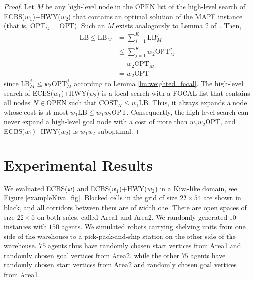 \documentclass[letterpaper]{article}
\theoremstyle{definition}
\newcommand{\open}{\mbox{OPEN}\xspace}
\newcommand{\focal}{\mbox{FOCAL}\xspace}
\newcommand{\lb}{\mbox{LB}\xspace}
\newcommand{\lbn}[1]{\ensuremath{\mbox{LB}_{#1}}}
\newcommand{\lbna}[2]{\ensuremath{\mbox{LB}_{#1}^{#2}}}
\newcommand{\opt}{\mbox{OPT}\xspace}
\newcommand{\optn}[1]{\ensuremath{\mbox{OPT}_{#1}}}
\newcommand{\optna}[2]{\ensuremath{\mbox{OPT}_{#1}^{#2}}}
\newcommand{\costn}[1]{\ensuremath{\mbox{COST}_{#1}}}
\begin{document}
\begin{proof}
  Let $M$ be any high-level node in the \open list of the high-level search of
  ECBS($w_1$)+HWY($w_2$) that contains an optimal solution of the MAPF
  instance (that is, $\optn M = \opt$). Such an $M$ exists analogously to
  Lemma 2 of~\cite{SSFS:AIJ:15}. Then,
{\small
\begin{align*}
\lb \leq \lbn M & = \sum_{j=1}^K \lbna M j \\
& \leq \sum_{j=1}^K w_2 \optna M j \\
& = w_2 \optn M \\
& = w_2 \opt
\end{align*}
} since $\lbna M j \leq w_2 \optna M j$ according to Lemma
\ref{lm:weighted_focal}. The high-level search of ECBS($w_1$)+HWY($w_2$) is a
focal search with a \focal list that contains all nodes $N \in \open$ such
that $\costn N \leq w_1 \lb$. Thus, it always expands a node whose cost is at
most $w_1 \lb \leq w_1 w_2 \opt$. Consequently, the high-level search can
never expand a high-level goal node with a cost of more than $w_1 w_2 \opt$,
and ECBS($w_1$)+HWY($w_2$) is $w_1 w_2$-suboptimal.
\end{proof}

\section{Experimental Results}

We evaluated ECBS($w$) and ECBS($w_1$)+HWY($w_2$) in a Kiva-like domain, see
Figure \ref{exampleKiva_fig}. Blocked cells in the grid of size $22 \times 54$
are shown in black, and all corridors between them are of width one. There are
open spaces of size $22 \times 5$ on both sides, called Area1 and Area2. We
randomly generated $10$ instances with $150$ agents. We simulated robots
carrying shelving units from one side of the warehouse to a pick-pack-and-ship
station on the other side of the warehouse. $75$ agents thus have randomly
chosen start vertices from Area1 and randomly chosen goal vertices from Area2,
while the other $75$ agents have randomly chosen start vertices from Area2 and
randomly chosen goal vertices from Area1.
\end{document}
